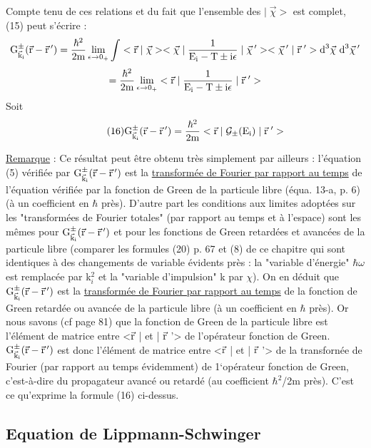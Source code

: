 Compte tenu de ces relations et du fait que l'ensemble des $|\;\vec{\chi}>$ est
complet, (15) peut s'écrire :
\[
\text{G}^\pm_{\vec{\text{k}}_{\text{i}}}(\vec{\text{r}}-\vec{\text{r}}\,')=\frac{\hbar^2}{2\text{m}}
\lim_{\epsilon\to 0_+}\int
<\vec{\text{r}}\;|\;\vec{\chi}>
<\vec{\chi}\;|\;
\frac{1}{\text{E}_{\text{i}}-\text{T}\pm\text{i}\epsilon}
\;|\;\vec{\chi}\,'><\vec{\chi}\,'\;|\;\vec{\text{r}}\;'>
\text{d}^3\vec{\chi}\text{ d}^3\vec{\chi}\,'
\]
\[=\frac{\hbar^2}{2\text{m}}
\lim_{\epsilon\to 0_+}
<\vec{\text{r}}\;|\;
\frac{1}{\text{E}_{\text{i}}-\text{T}\pm\text{i}\epsilon}
\;|\;\vec{\text{r}}\;'>
\]
Soit
\[
\tag{16}\text{G}^\pm_{\vec{\text{k}}_{\text{i}}}(\vec{\text{r}}-\vec{\text{r}}\,')=
\frac{\hbar^2}{2\text{m}}
<\vec{\text{r}}\;|\;
\mathcal{G}_\pm(\text{E}_{\text{i}})
\;|\;\vec{\text{r}}\;'>
\]

\ul{Remarque} :
Ce résultat peut être obtenu très simplement par ailleurs : l'équation
(5) vérifiée par $\text{G}^\pm_{\vec{\text{k}}_{\text{i}}}(\vec{\text{r}}-\vec{\text{r}}\,')$ est la \ul{transformée de Fourier par rapport
au temps} de l'équation vérifiée par la fonction de Green de la particule
libre (équa. 13-a, p. 6) (à un coefficient en $\hbar$ près). D'autre part les
conditions aux limites adoptées sur les "transformées de Fourier totales"
(par rapport au temps et à l'espace) sont les mêmes pour
$\text{G}^\pm_{\vec{\text{k}}_{\text{i}}}(\vec{\text{r}}-\vec{\text{r}}\,')$ et
pour les fonctions de Green retardées et avancées de la particule libre
(comparer les formules (20) p. 67 et (8) de ce chapitre qui sont identiques à des
changements de variable évidents près : la "variable d'énergie"
$\hbar\omega$ est remplacée par k$_i^2$ et la "variable d'impulsion" k par $\chi$). On en déduit que
$\text{G}^\pm_{\vec{\text{k}}_{\text{i}}}(\vec{\text{r}}-\vec{\text{r}}\,')$ est la \ul{transformée
de Fourier par rapport au temps}
de la fonction de Green retardée ou avancée de la particule libre (à un
coefficient en $\hbar$ près). Or nous savons (cf page 81) que la fonction de
%
Green de la particule libre est l'élément de matrice entre <$\vec{\text{r}}$ | et | $\vec{\text{r}}$ '>
de l'opérateur fonction de Green. $\text{G}^\pm_{\vec{\text{k}}_{\text{i}}}(\vec{\text{r}}-\vec{\text{r}}\,')$ est donc l'élément de matrice entre <$\vec{\text{r}}$ | et | $\vec{\text{r}}$ '> de la
transfornée de Fourier (par rapport au
temps évidemment) de 1‘opérateur fonction de Green, c'est-à-dire du propagateur
avancé ou retardé (au coefficient $\hbar^2$/2m près). C'est ce qu'exprime
la formule (16) ci-dessus.

\subsection{Equation de Lippmann-Schwinger}%

